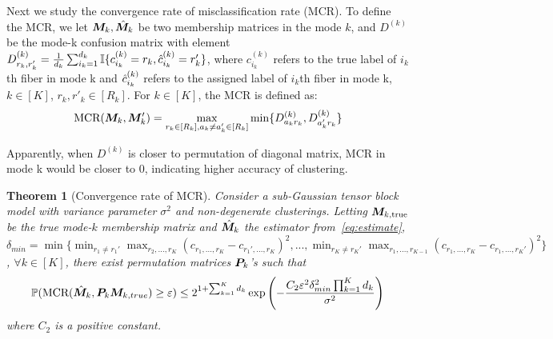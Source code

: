 \documentclass{article}
\newtheorem{theorem}{Theorem}
\begin{document}
Next we study the convergence rate of misclassification rate (MCR). To define the MCR, we let $\boldsymbol{M}_k, \hat{\boldsymbol{M}}_k$ be two membership matrices in the mode $k$, and $D^{(k)}$ be the mode-k confusion matrix with element $D_{r_k,r_k'}^{(k)}=\frac{1}{d_k}\sum_{i_k=1}^{d_k}\mathbb{I}\{c_{i_k}^{(k)}=r_k,\hat{c}_{i_k}^{(k)}=r_k'\}$, where $c^{(k)}_{i_k}$ refers to the true label of $i_k$th fiber in mode k and $\hat{c}^{(k)}_{i_k}$ refers to the assigned label of $i_k$th fiber in mode k, $k\in[K]$, $r_k,r'_k\in [R_k]$. For $k\in[K]$, the MCR is defined as: 
\begin{equation} \label{eq:MCR}
\text{MCR}(\boldsymbol{M}_k,\boldsymbol{M}'_k) = \max_{r_k\in [R_k], a_k\neq a'_k\in [R_k]}\min\{D^{(k)}_{a_kr_k},D^{(k)}_{a'_kr_k}\}
\end{equation}

Apparently, when $D^{(k)}$ is closer to permutation of diagonal matrix, MCR in mode k would be closer to 0, indicating higher accuracy of clustering.



\begin{theorem}[Convergence rate of MCR] \label{thm:mcr}
	Consider a sub-Gaussian tensor block model with variance parameter $\sigma^2$ and non-degenerate clusterings. Letting $\boldsymbol{M}_{k,\text{true}}$ be the true mode-$k$ membership matrix and $\hat {\boldsymbol{M}}_k$ the estimator from~\eqref{eq:estimate},   $\delta_{min}=\min\{\displaystyle\min_{r_1\neq r_1'}\max_{r_2,...,r_K}(c_{r_1,...,r_K}-c_{r_1',...,r_K})^2,...,\displaystyle\min_{r_K\neq r_K'}\max_{r_1,...,r_{K-1}}(c_{r_1,...,r_K}-c_{r_1,...,r_K'})^2\}$,  $\forall k\in[K]$, there exist permutation matrices $\boldsymbol{P}_k$'s such that
	\begin{equation} \label{eq:mcrbound}
	\mathbb{P}(\text{MCR}(\hat{\boldsymbol{M}}_k, \boldsymbol{P}_k\boldsymbol{M}_{k,true})\geq \varepsilon) \leq  2^{1+\sum_{k=1}^Kd_k}\exp{\left(-\frac{C_2\varepsilon^2\delta_{min}^2\prod_{k=1}^Kd_k}{\sigma^2}\right)}
	\end{equation}
	where $C_2$ is a positive constant.
\end{theorem}
\end{document}
